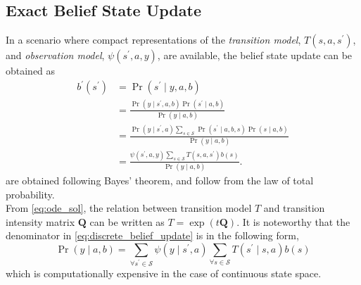 \subsection{Exact Belief State Update}
\label{sec:exact_update}
In a scenario where compact representations of the \textit{transition model}, $ T(s, a, s^{\prime})$,  and \textit{observation model}, $ \psi(s^{\prime}, a, y) $, are available, the belief state update can be obtained as \cite{KAELBLING199899}
\begin{align}
b^{\prime}\left(s^{\prime}\right) &=\operatorname{Pr}\left(s^{\prime} \mid y, a, b\right) \label{eq:bu1}\\
&=\frac{\operatorname{Pr}\left(y \mid s^{\prime}, a, b\right) \operatorname{Pr}\left(s^{\prime} \mid a, b\right)}{\operatorname{Pr}(y \mid a, b)} \label{eq:bu2}\\
&=\frac{\operatorname{Pr}\left(y \mid s^{\prime}, a\right) \sum_{s \in \mathcal{S}} \operatorname{Pr}\left(s^{\prime} \mid a, b, s\right) \operatorname{Pr}(s \mid a, b)}{\operatorname{Pr}(y \mid a, b)}  \label{eq:bu3}\\
&=\frac{\psi\left(s^{\prime}, a, y\right) \sum_{s \in \mathcal{S}} T\left(s,a, s^{\prime}\right) b(s)}{\operatorname{Pr}(y \mid a, b)}.
\label{eq:discrete_belief_update}
\end{align}
 are obtained following Bayes' theorem, and  follow from the law of total probability. \\
From \autoref{eq:ode_sol}, the relation between transition model $ T $ and transition intensity matrix $ \textbf{Q} $ can be written as $ T = \exp(t\textbf{Q}) $.
It is noteworthy that the denominator in \autoref{eq:discrete_belief_update} is in the following form, 
\begin{equation}
\operatorname{Pr}(y \mid a, b) = \sum_{\forall s^{\prime} \in \mathcal{S}} \psi(y \mid s^{\prime}, a) \sum_{\forall s \in \mathcal{S}} T(s^{\prime}\mid s,a) b(s)
\label{eq:nasty_denom}
\end{equation}
which is computationally expensive in the case of continuous state space.
